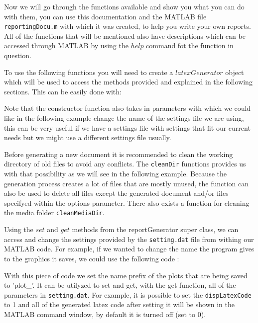 
Now we will go through the functions available and show you what you can do with them, you can
use this documentation and the MATLAB file {\tt reportingDocu.m} with which it was created, to 
help you write your own reports. All of the functions that will be mentioned also have 
descriptions which can be accessed through MATLAB by using the $help$ command fot the function
in question.


To use the following functions you will need to create a $latexGenerator$ object which will be used
to access the methods provided and explained in the following sections. This can be easily done with:


Note that the constructor function also takes in parameters with which we could like in the following example 
change the name of the settings file we are using, this can be very useful if we have a settings file with 
settings that fit our current needs but we might use a different settings file usually.


Before generating a new document it is recommended to clean the working directory of old files to avoid 
any conflicts. The {\tt cleanDir} functions provides us with that possibility as we will see in the 
following example. Because the generation process creates a lot of files that are mostly unused, 
the function can also be used to delete all files execpt the generated document and/or files 
specifyed within the options parameter. There also exists a function for cleaning the media folder {\tt cleanMediaDir}.



Using the $set$ and $get$ methods from the reportGenerator super class, we can access and change the
settings provided by the {\tt setting.dat} file from withing our MATLAB code. For example, if we wanted 
to change the name the program gives to the graphics it saves, we could use the following code : 


With this piece of code we set the name prefix of the plots that are being saved to 'plot\_'. 
It can be utilyzed to set and get, with the get function, all of the parameters in {\tt setting.dat}. For example, it
is possible to set the {\tt dispLatexCode} to 1 and all of the generated latex code after setting it will be shown in 
the MATLAB command window, by default it is turned off (set to 0).

